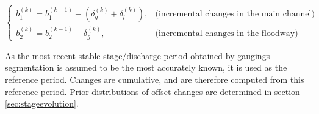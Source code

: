 \documentclass[11pt]{article}
\begin{document}
       \begin{equation}
          \begin{cases}
           b_1^{(k)} = b_1^{(k-1)}-(\delta_g^{(k)}+\delta_l^{(k)}), & \text{(incremental changes in the main channel)}\\
           b_2^{(k)} = b_2^{(k-1)}-\delta_g^{(k)}, & \text{(incremental changes in the floodway)}
          \end{cases}
          \label{eq:SPD_Pt}
        \end{equation}
       
       As the most recent stable stage/discharge period obtained by gaugings segmentation is assumed to be the most accurately known, it is used as the reference period. Changes are cumulative, and are therefore computed from this reference period. Prior distributions of offset changes are determined in section \ref{sec:stageevolution}.       
\end{document}
